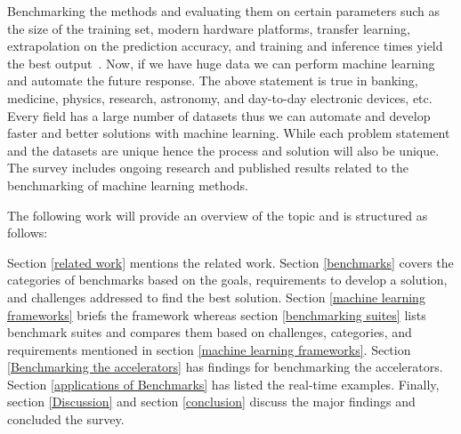 \documentclass[a4paper,UKenglish,cleveref, autoref, thm-restate]{lipics-v2021}
\begin{document}
Benchmarking the methods and evaluating them on certain parameters such as the size of the training set, modern hardware platforms, transfer learning, extrapolation on the prediction accuracy, and training and inference times yield the best output~\cite{sctmlb}. Now, if we have huge data we can perform machine learning and automate the future response. The above statement is true in banking, medicine, physics, research, astronomy, and day-to-day electronic devices, etc. Every field has a large number of datasets thus we can automate and develop faster and better solutions with machine learning. While each problem statement and the datasets are unique hence the process and solution will also be unique. The survey includes ongoing research and published results related to the benchmarking of machine learning methods. 

The following work will provide an overview of the topic and is structured as follows: 

Section \ref{related work} mentions the related work. Section \ref{benchmarks} covers the categories of benchmarks based on the goals, requirements to develop a solution, and challenges addressed to find the best solution. Section \ref{machine learning frameworks} briefs the framework whereas section \ref{benchmarking suites} lists benchmark suites and compares them based on challenges, categories, and requirements mentioned in section \ref{machine learning frameworks}. Section \ref{Benchmarking the accelerators} has findings for benchmarking the accelerators. Section \ref{applications of Benchmarks} has listed the real-time examples. Finally, section \ref{Discussion} and section \ref{conclusion} discuss the major findings and concluded the survey.
\end{document}
